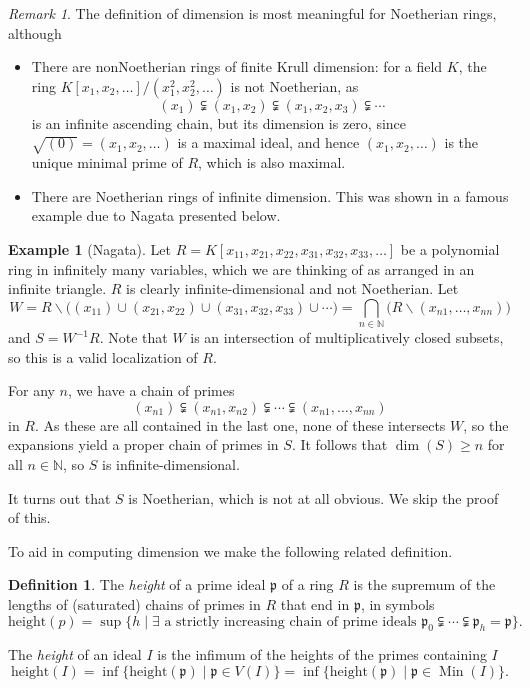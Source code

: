 \documentclass{amsart}[12pt]
\def\htt{\mathrm{height}}
\def\Min{\operatorname{Min}}
\newcommand{\NN}{\mathbb{N}}
\newcommand{\fp}{{\mathfrak p}}
\newcommand{\p}{{\mathfrak p}}
\numberwithin{equation}{section}
\theoremstyle{plain} %
\theoremstyle{definition}
\newtheorem{defn}[equation]{Definition}
\newtheorem{example}[equation]{Example}
\theoremstyle{remark}
\newtheorem{rem}[equation]{Remark}
\begin{document}
\begin{rem} The definition of dimension is most meaningful for Noetherian rings, although 
\begin{itemize}
\item
There are nonNoetherian rings of finite Krull dimension:  for a field $K$, the ring $K[x_1,x_2,\dots]/(x_1^2,x_2^2,\dots)$ is not Noetherian, as
\[ (x_1) \subsetneqq (x_1,x_2) \subsetneqq (x_1,x_2,x_3) \subsetneqq \cdots\]
is an infinite ascending chain, but its dimension is zero, since $\sqrt{(0)} = (x_1,x_2,\dots)$ is a maximal ideal, and hence $(x_1,x_2,\dots)$ is the unique minimal prime of $R$, which is also maximal.
\item
There are Noetherian rings of infinite dimension.  This was shown in a famous example due to Nagata presented below. 
\end{itemize}
\end{rem}


\begin{example}[Nagata]
\label{ex:Nagata}
	Let $R=K[x_{11},x_{21},x_{22}, x_{31}, x_{32}, x_{33},\dots]$ be a polynomial ring in infinitely many variables, which we are thinking of as arranged in an infinite triangle. $R$ is clearly infinite-dimensional and not Noetherian. Let
	\[ W=R\smallsetminus \big((x_{11}) \cup (x_{21},x_{22}) \cup (x_{31},x_{32},x_{33})  \cup \cdots \big) = \bigcap_{n\in \NN} \big(R \smallsetminus (x_{n1},\dots,x_{nn})\big)\]
	and $S=W^{-1}R$. Note that $W$ is an intersection of multiplicatively closed subsets, so this is a valid localization of $R$.
	
	For any $n$, we have a chain of primes \[(x_{n1}) \subsetneqq (x_{n1},x_{n2}) \subsetneqq \cdots \subsetneqq (x_{n1},\dots,x_{nn})\]
	in $R$. As these are all contained in the last one, none of these intersects $W$, so the expansions yield a proper chain of primes in $S$.  It follows that $\dim(S) \geq n$ for all $n\in \NN$, so $S$ is infinite-dimensional.
	
	It turns out that $S$ is Noetherian, which is not at all obvious. We skip the proof of this.
\end{example}


To aid in computing dimension we make the following related definition.

\begin{defn}
\label{def:ht}
The \emph{height} of a prime ideal  $\p$ of a ring $R$  is the supremum of the lengths of (saturated) chains of primes in $R$ that end in $\p$, in symbols
$$
\htt(p)=\sup \{h \mid \exists \text{ a strictly increasing chain of prime ideals } \fp_0 \subsetneqq \cdots \subsetneqq \fp_h=\p\}.
$$

The \emph{height} of an ideal $I$ is the infimum of the heights of the primes containing $I$
\[
\htt(I)=\inf\{\htt(\p)\mid \p\in V(I)\}=\inf\{\htt(\p)\mid \p\in \Min(I)\}.
\]
\end{defn}
\end{document}

